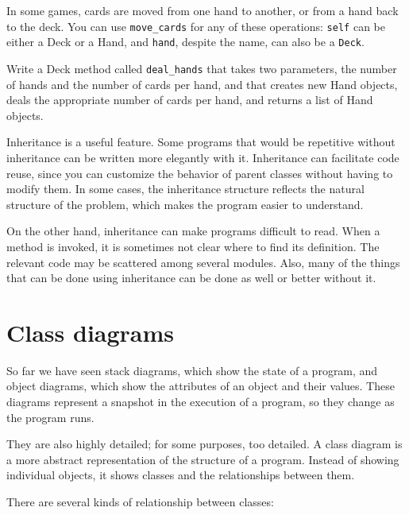 \documentclass[10pt]{book}
\begin{document}
In some games, cards are moved from one hand to another,
or from a hand back to the deck.  You can use \verb"move_cards"
for any of these operations: {\tt self} can be either a Deck
or a Hand, and {\tt hand}, despite the name, can also be a {\tt Deck}.

\begin{exercise}

Write a Deck method called \verb"deal_hands" that takes two
parameters, the number of hands and the number of cards per
hand, and that creates new Hand objects, deals the appropriate
number of cards per hand, and returns a list of Hand objects.

\end{exercise}

Inheritance is a useful feature.  Some programs that would be
repetitive without inheritance can be written more elegantly
with it.  Inheritance can facilitate code reuse, since you can
customize the behavior of parent classes without having to modify
them.  In some cases, the inheritance structure reflects the natural
structure of the problem, which makes the program easier to
understand.

On the other hand, inheritance can make programs difficult to read.
When a method is invoked, it is sometimes not clear where to find its
definition.  The relevant code may be scattered among several modules.
Also, many of the things that can be done using inheritance can be
done as well or better without it.  


\section{Class diagrams}
\label{class.diagram}

So far we have seen stack diagrams, which show the state of
a program, and object diagrams, which show the attributes
of an object and their values.  These diagrams represent a snapshot
in the execution of a program, so they change as the program
runs.

They are also highly detailed; for some purposes, too
detailed.  A class diagram is a more abstract representation
of the structure of a program.  Instead of showing individual
objects, it shows classes and the relationships between them.

There are several kinds of relationship between classes:
\end{document}
